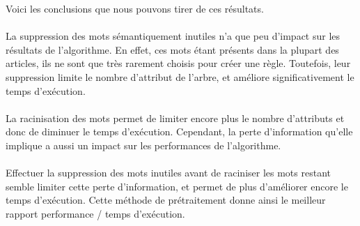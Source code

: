 Voici les conclusions que nous pouvons tirer de ces résultats.
\paragraph{}
La suppression des mots sémantiquement inutiles n’a que peu d’impact sur les résultats de l’algorithme. En effet, ces mots étant présents dans la plupart des articles, ils ne sont que très rarement choisis pour créer une règle. Toutefois, leur suppression limite le nombre d’attribut de l’arbre, et améliore significativement le temps d’exécution.
\paragraph{}
La racinisation des mots permet de limiter encore plus le nombre d’attributs et donc de diminuer le temps d’exécution. Cependant, la perte d’information qu’elle implique a aussi un impact sur les performances de l’algorithme.
\paragraph{}
Effectuer la suppression des mots inutiles avant de raciniser les mots restant semble limiter cette perte d’information, et permet de plus d’améliorer encore le temps d’exécution. Cette méthode de prétraitement donne ainsi le meilleur rapport performance / temps d’exécution.

